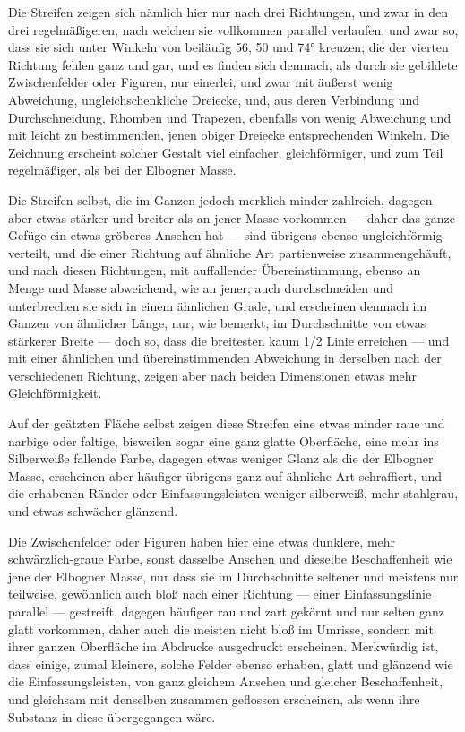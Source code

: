 \documentclass[a4paper, 11pt, oneside, german]{article}
\begin{document}
Die Streifen zeigen sich nämlich hier nur nach drei Richtungen, und zwar in den drei regelmäßigeren, nach welchen sie vollkommen parallel verlaufen, und zwar so, dass sie sich unter Winkeln von beiläufig 56, 50 und 74° kreuzen; die der vierten Richtung fehlen ganz und gar, und es finden sich demnach, als durch sie gebildete Zwischenfelder oder Figuren, nur einerlei, und zwar mit äußerst wenig Abweichung, ungleichschenkliche Dreiecke, und, aus deren Verbindung und Durchschneidung, Rhomben und Trapezen, ebenfalls von wenig Abweichung und mit leicht zu bestimmenden, jenen obiger Dreiecke entsprechenden Winkeln. Die Zeichnung erscheint solcher Gestalt viel einfacher, gleichförmiger, und zum Teil regelmäßiger, als bei der Elbogner Masse.

Die Streifen selbst, die im Ganzen jedoch merklich minder zahlreich, dagegen aber etwas stärker und breiter als an jener Masse vorkommen --- daher das ganze Gefüge ein etwas gröberes Ansehen hat --- sind übrigens ebenso ungleichförmig verteilt, und die einer Richtung auf ähnliche Art partienweise zusammengehäuft, und nach diesen Richtungen, mit auffallender Übereinstimmung, ebenso an Menge und Masse abweichend, wie an jener; auch durchschneiden und unterbrechen sie sich in einem ähnlichen Grade, und erscheinen demnach im Ganzen von ähnlicher Länge, nur, wie bemerkt, im Durchschnitte von etwas stärkerer Breite --- doch so, dass die breitesten kaum 1/2 Linie erreichen --- und mit einer ähnlichen und übereinstimmenden Abweichung in derselben nach der verschiedenen Richtung, zeigen aber nach beiden Dimensionen etwas mehr Gleichförmigkeit.

Auf der geätzten Fläche selbst zeigen diese Streifen eine etwas minder raue und narbige oder faltige, bisweilen sogar eine ganz glatte Oberfläche, eine mehr ins Silberweiße fallende Farbe, dagegen etwas weniger Glanz als die der Elbogner Masse, erscheinen aber häufiger übrigens ganz auf ähnliche Art schraffiert, und die erhabenen Ränder oder Einfassungsleisten weniger silberweiß, mehr stahlgrau, und etwas schwächer glänzend.

Die Zwischenfelder oder Figuren haben hier eine etwas dunklere, mehr schwärzlich-graue Farbe, sonst dasselbe Ansehen und dieselbe Beschaffenheit wie jene der Elbogner Masse, nur dass sie im Durchschnitte seltener und meistens nur teilweise, gewöhnlich auch bloß nach einer Richtung --- einer Einfassungslinie parallel --- gestreift, dagegen häufiger rau und zart gekörnt und nur selten ganz glatt vorkommen, daher auch die meisten nicht bloß im Umrisse, sondern mit ihrer ganzen Oberfläche im Abdrucke ausgedruckt erscheinen. Merkwürdig ist, dass einige, zumal kleinere, solche Felder ebenso erhaben, glatt und glänzend wie die Einfassungsleisten, von ganz gleichem Ansehen und gleicher Beschaffenheit, und gleichsam mit denselben zusammen geflossen erscheinen, als wenn ihre Substanz in diese übergegangen wäre.
\end{document}
